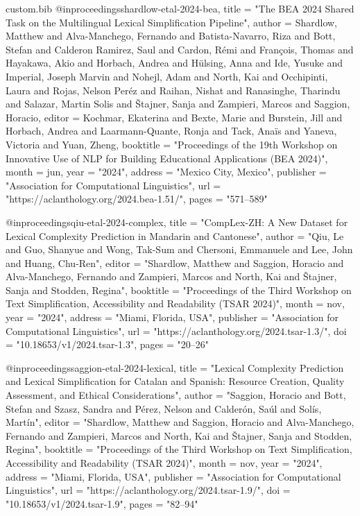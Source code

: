 \begin{filecontents*}[overwrite]{custom.bib}
@inproceedings{shardlow-etal-2024-bea,
    title = "The {BEA} 2024 Shared Task on the Multilingual Lexical Simplification Pipeline",
    author = {Shardlow, Matthew  and
      Alva-Manchego, Fernando  and
      Batista-Navarro, Riza  and
      Bott, Stefan  and
      Calderon Ramirez, Saul  and
      Cardon, R{\'e}mi  and
      Fran{\c{c}}ois, Thomas  and
      Hayakawa, Akio  and
      Horbach, Andrea  and
      H{\"u}lsing, Anna  and
      Ide, Yusuke  and
      Imperial, Joseph Marvin  and
      Nohejl, Adam  and
      North, Kai  and
      Occhipinti, Laura  and
      Rojas, Nelson Per{\'e}z  and
      Raihan, Nishat  and
      Ranasinghe, Tharindu  and
      Salazar, Martin Solis  and
      {\v{S}}tajner, Sanja  and
      Zampieri, Marcos  and
      Saggion, Horacio},
    editor = {Kochmar, Ekaterina  and
      Bexte, Marie  and
      Burstein, Jill  and
      Horbach, Andrea  and
      Laarmann-Quante, Ronja  and
      Tack, Ana{\"i}s  and
      Yaneva, Victoria  and
      Yuan, Zheng},
    booktitle = "Proceedings of the 19th Workshop on Innovative Use of NLP for Building Educational Applications (BEA 2024)",
    month = jun,
    year = "2024",
    address = "Mexico City, Mexico",
    publisher = "Association for Computational Linguistics",
    url = "https://aclanthology.org/2024.bea-1.51/",
    pages = "571--589"
}

@inproceedings{qiu-etal-2024-complex,
    title = "{C}omp{L}ex-{ZH}: A New Dataset for Lexical Complexity Prediction in {M}andarin and {C}antonese",
    author = "Qiu, Le  and
      Guo, Shanyue  and
      Wong, Tak-Sum  and
      Chersoni, Emmanuele  and
      Lee, John  and
      Huang, Chu-Ren",
    editor = "Shardlow, Matthew  and
      Saggion, Horacio  and
      Alva-Manchego, Fernando  and
      Zampieri, Marcos  and
      North, Kai  and
      {\v{S}}tajner, Sanja  and
      Stodden, Regina",
    booktitle = "Proceedings of the Third Workshop on Text Simplification, Accessibility and Readability (TSAR 2024)",
    month = nov,
    year = "2024",
    address = "Miami, Florida, USA",
    publisher = "Association for Computational Linguistics",
    url = "https://aclanthology.org/2024.tsar-1.3/",
    doi = "10.18653/v1/2024.tsar-1.3",
    pages = "20--26"
}

@inproceedings{saggion-etal-2024-lexical,
    title = "Lexical Complexity Prediction and Lexical Simplification for {C}atalan and {S}panish: Resource Creation, Quality Assessment, and Ethical Considerations",
    author = "Saggion, Horacio  and
      Bott, Stefan  and
      Szasz, Sandra  and
      P{\'e}rez, Nelson  and
      Calder{\'o}n, Sa{\'u}l  and
      Sol{\'i}s, Mart{\'i}n",
    editor = "Shardlow, Matthew  and
      Saggion, Horacio  and
      Alva-Manchego, Fernando  and
      Zampieri, Marcos  and
      North, Kai  and
      {\v{S}}tajner, Sanja  and
      Stodden, Regina",
    booktitle = "Proceedings of the Third Workshop on Text Simplification, Accessibility and Readability (TSAR 2024)",
    month = nov,
    year = "2024",
    address = "Miami, Florida, USA",
    publisher = "Association for Computational Linguistics",
    url = "https://aclanthology.org/2024.tsar-1.9/",
    doi = "10.18653/v1/2024.tsar-1.9",
    pages = "82--94"
}


\end{filecontents*}

